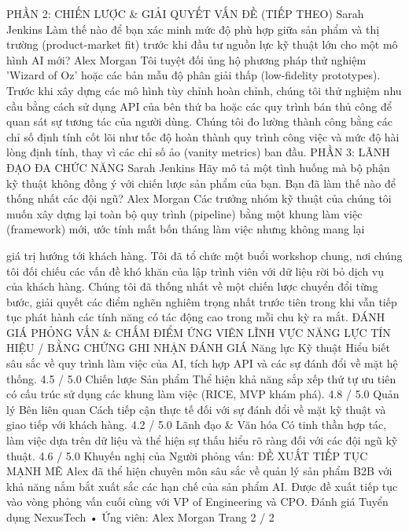 \documentclass[12pt]{article}
\begin{document}
PHẦN 2: CHIẾN LƯỢC \& GIẢI QUYẾT VẤN ĐỀ (TIẾP THEO)
Sarah Jenkins
Làm thế nào để bạn xác minh mức độ phù hợp giữa sản phẩm và thị trường (product-market fit) trước khi đầu tư nguồn lực kỹ thuật lớn cho một mô hình AI mới?
Alex Morgan
Tôi tuyệt đối ủng hộ phương pháp thử nghiệm 'Wizard of Oz' hoặc các bản mẫu độ phân giải thấp (low-fidelity prototypes). Trước khi xây dựng các mô hình tùy chỉnh hoàn chỉnh, chúng tôi thử nghiệm nhu cầu bằng cách sử dụng API của bên thứ ba hoặc các quy trình bán thủ công để quan sát sự tương tác của người dùng. Chúng tôi đo lường thành công bằng các chỉ số định tính cốt lõi như tốc độ hoàn thành quy trình công việc và mức độ hài lòng định tính, thay vì các chỉ số ảo (vanity metrics) ban đầu.
PHẦN 3: LÃNH ĐẠO ĐA CHỨC NĂNG
Sarah Jenkins
Hãy mô tả một tình huống mà bộ phận kỹ thuật không đồng ý với chiến lược sản phẩm của bạn. Bạn đã làm thế nào để thống nhất các đội ngũ?
Alex Morgan
Các trưởng nhóm kỹ thuật của chúng tôi muốn xây dựng lại toàn bộ quy trình (pipeline) bằng một khung làm việc (framework) mới, ước tính mất bốn tháng làm việc nhưng không mang lại

giá trị hướng tới khách hàng. Tôi đã tổ chức một buổi workshop chung, nơi chúng tôi đối chiếu các vấn đề khó khăn của lập trình viên với dữ liệu rời bỏ dịch vụ của khách hàng. Chúng tôi đã thống nhất về một chiến lược chuyển đổi từng bước, giải quyết các điểm nghẽn nghiêm trọng nhất trước tiên trong khi vẫn tiếp tục phát hành các tính năng có tác động cao trong mỗi chu kỳ ra mắt.
ĐÁNH GIÁ PHỎNG VẤN \& CHẤM ĐIỂM ỨNG VIÊN
LĨNH VỰC NĂNG LỰC
TÍN HIỆU / BẰNG CHỨNG GHI NHẬN
ĐÁNH GIÁ
Năng lực Kỹ thuật
Hiểu biết sâu sắc về quy trình làm việc của AI, tích hợp API và các sự đánh đổi về mặt hệ thống.
4.5 /
5.0
Chiến lược Sản phẩm
Thể hiện khả năng sắp xếp thứ tự ưu tiên có cấu trúc sử dụng các khung làm việc (RICE, MVP khám phá).
4.8 /
5.0
Quản lý Bên liên quan
Cách tiếp cận thực tế đối với sự đánh đổi về mặt kỹ thuật và giao tiếp với khách hàng.
4.2 /
5.0
Lãnh đạo \&
Văn hóa
Có tinh thần hợp tác, làm việc dựa trên dữ liệu và thể hiện sự thấu hiểu rõ ràng đối với các đội ngũ kỹ thuật.
4.6 /
5.0
Khuyến nghị của Người phỏng vấn: ĐỀ XUẤT TIẾP TỤC MẠNH MẼ
Alex đã thể hiện chuyên môn sâu sắc về quản lý sản phẩm B2B với khả năng nắm bắt xuất sắc các hạn chế của sản phẩm AI. Được đề xuất tiếp tục vào vòng phỏng vấn cuối cùng với VP of Engineering và CPO.
Đánh giá Tuyển dụng NexusTech • Ứng viên: Alex Morgan
Trang 2 / 2
\end{document}
